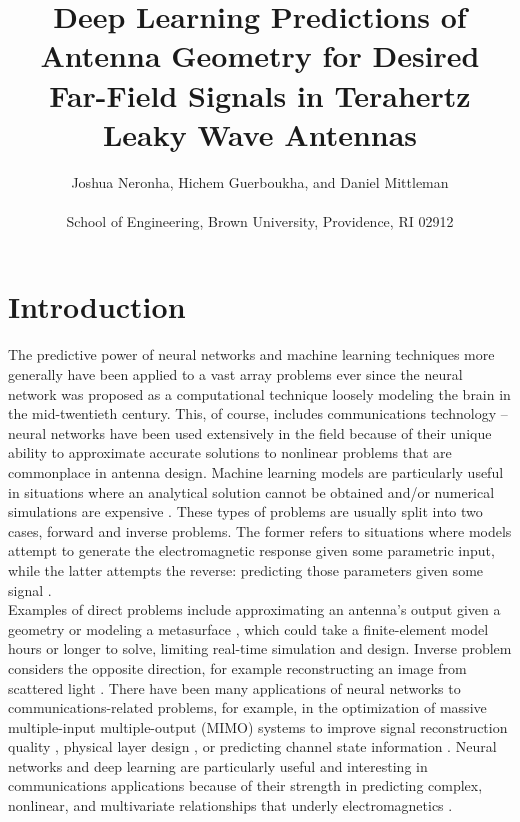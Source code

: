 \documentclass[11pt]{article}
\begin{document}
\title{Deep Learning Predictions of Antenna Geometry for Desired Far-Field Signals in Terahertz Leaky Wave Antennas}
\author{Joshua Neronha, Hichem Guerboukha, and Daniel Mittleman \\ \\ \small School of Engineering, Brown University, Providence, RI 02912}
\date{}

\maketitle

\section*{Introduction}

The predictive power of neural networks and machine learning techniques more generally have been applied to a vast array problems ever since the neural network was proposed as a computational technique loosely modeling the brain in the mid-twentieth century. \cite{McCulloch:1943vq} This, of course, includes communications technology -- neural networks have been used extensively in the field because of their unique ability to approximate accurate solutions to nonlinear problems that are commonplace in antenna design. Machine learning models are particularly useful in situations where an analytical solution cannot be obtained and/or numerical simulations are expensive \cite{Kim, Massa}. These types of problems are usually split into two cases, forward and inverse problems. The former refers to situations where models attempt to generate the electromagnetic response given some parametric input, while the latter attempts the reverse: predicting those parameters given some signal \cite{9395365}. \\

\noindent Examples of direct problems include approximating an antenna's output given a geometry \cite{8608745} or modeling a metasurface \cite{Nadell:19}, which could take a finite-element model hours or longer to solve, limiting real-time simulation and design. Inverse problem considers the opposite direction, for example reconstructing an image from scattered light \cite{Sun:18}. There have been many applications of neural networks to communications-related problems, for example, in the optimization of massive multiple-input multiple-output (MIMO) systems to improve signal reconstruction quality \cite{8322184}, physical layer design \cite{DBLP:journals/corr/OSheaEC17}, or predicting channel state information \cite{8395053}. Neural networks and deep learning are particularly useful and interesting in communications applications because of their strength in predicting complex, nonlinear, and multivariate relationships that underly electromagnetics \cite{raissi2018deep}.\\
\end{document}
